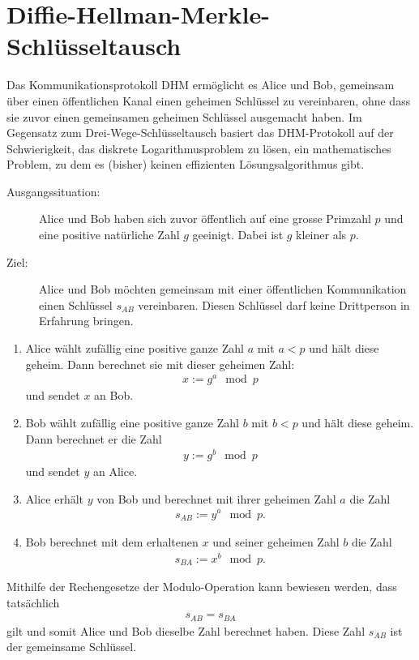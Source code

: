 \section{Diffie-Hellman-Merkle-Schlüsseltausch}
\begin{myprocedure}\label{myprocedure:Diffie}
	Das Kommunikationsprotokoll \gls{DHM} ermöglicht es Alice und Bob, gemeinsam über einen öffentlichen Kanal einen geheimen Schlüssel zu vereinbaren, ohne dass sie zuvor einen gemeinsamen geheimen Schlüssel ausgemacht haben. Im Gegensatz zum Drei-Wege-Schlüsseltausch basiert das \gls{DHM}-Protokoll auf der Schwierigkeit, das diskrete Logarithmusproblem zu lösen, ein mathematisches Problem, zu dem es (bisher) keinen effizienten Lösungsalgorithmus gibt.
	\begin{description}
		\item[Ausgangssituation:] Alice und Bob haben sich zuvor öffentlich auf eine grosse Primzahl $p$ und eine positive natürliche Zahl $g$ geeinigt. Dabei ist $g$ kleiner als $p$.
		\item[Ziel:] Alice und Bob möchten gemeinsam mit einer öffentlichen Kommunikation einen Schlüssel $s_{AB}$ vereinbaren. Diesen Schlüssel darf keine Drittperson in Erfahrung bringen.
	\end{description}
	\begin{enumerate}
		\item Alice wählt zufällig eine positive ganze Zahl $a$ mit $a<p$ und hält diese geheim. Dann berechnet sie mit dieser geheimen Zahl:
		      \begin{align*}
			      x := g^a\mod p
		      \end{align*}
		      und sendet $x$ an Bob.
		\item Bob wählt zufällig eine positive ganze Zahl $b$ mit $b<p$ und hält diese geheim. Dann berechnet er die Zahl
		      \begin{align*}
			      y := g^b\mod p
		      \end{align*}
		      und sendet $y$ an Alice.
		\item Alice erhält $y$ von Bob und berechnet mit ihrer geheimen Zahl $a$ die Zahl
		      \begin{align*}
			      s_{AB} := y^a\mod p.
		      \end{align*}
		\item Bob berechnet mit dem erhaltenen $x$ und seiner geheimen Zahl $b$ die Zahl
		      \begin{align*}
			      s_{BA} := x^b\mod p.
		      \end{align*}
	\end{enumerate}
	Mithilfe der Rechengesetze der Modulo-Operation kann bewiesen werden, dass tatsächlich
	\begin{align*}
		s_{AB} = s_{BA}
	\end{align*}
	gilt und somit Alice und Bob dieselbe Zahl berechnet haben. Diese Zahl $s_{AB}$ ist der gemeinsame Schlüssel.
\end{myprocedure}


